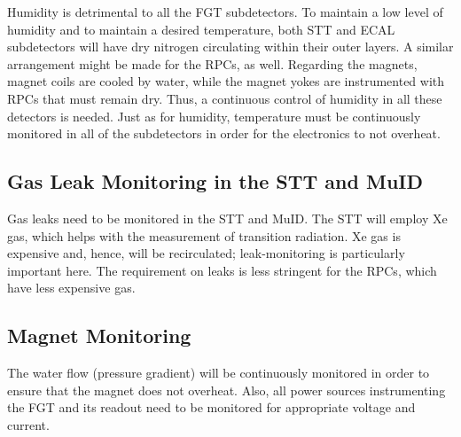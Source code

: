 Humidity is detrimental to all the FGT subdetectors. To maintain a low level of 
humidity and to maintain a desired temperature, both STT and ECAL subdetectors
will have dry nitrogen circulating within their outer layers. A similar arrangement 
might be made for the RPCs, as well. Regarding the magnets, magnet coils are cooled by water, 
while the magnet yokes are instrumented with RPCs that must remain dry. 
 Thus, a continuous control of 
humidity in all these detectors is needed.
Just as for humidity, temperature must be continuously monitored in all of the subdetectors
in order for the electronics to not overheat. 

\subsection{Gas Leak Monitoring in the STT and MuID}

Gas leaks need to be monitored in the STT and MuID.
The STT will employ Xe gas, which helps with the measurement of transition radiation.
Xe gas is expensive and, hence, will be recirculated; leak-monitoring is particularly important here.   
The requirement on leaks is less 
stringent for the RPCs, which have less expensive gas.

\subsection{Magnet Monitoring}

The water flow (pressure gradient) will be continuously monitored in order to ensure 
that the magnet does not overheat.  %
Also, all power sources instrumenting the FGT and its readout need to be monitored for 
appropriate voltage and current.









